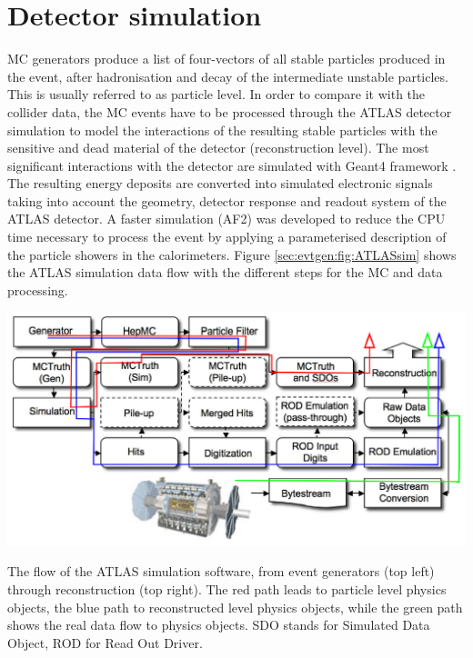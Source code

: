 \section{Detector simulation}
\label{chp:evtsim:detsim}


MC generators produce a list of four-vectors of all stable particles produced in the event, after hadronisation and decay of the intermediate unstable particles. This is usually referred to as particle level. In order to compare it with the collider data, the MC events have to be processed through the ATLAS detector simulation to model the interactions of the resulting stable particles with the sensitive and dead material of the detector (reconstruction level). The most significant interactions  with  the  detector are simulated with {\sc Geant4} framework \cite{geant}. The resulting energy deposits are converted into simulated electronic signals taking into account the geometry, detector response and readout system of the ATLAS detector. A faster simulation (AF2) \cite{AFII} was developed to reduce the CPU time necessary to process the event by applying a parameterised description of the particle showers in the calorimeters.
Figure \ref{sec:evtgen:fig:ATLASsim}  shows the ATLAS simulation data flow with the different steps for the MC and data processing.


\bfig[h!]
\includegraphics[width=\textwidth]{figures/EvtGen/atlassimul.png}
\captionsetup{width=0.85\textwidth} \caption{\small The flow of the ATLAS simulation software, from event generators (top left) through reconstruction (top right). The red path leads to particle level physics objects, the blue path to reconstructed level physics objects, while the green path shows the real data flow to physics objects. SDO stands for Simulated Data Object, ROD for Read Out Driver.}
\label{sec:evtgen:fig:ATLASsim}
\efig